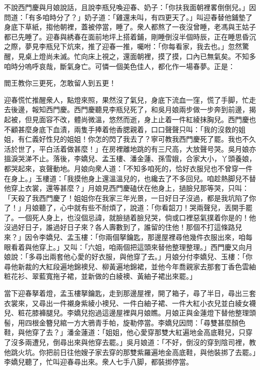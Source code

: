 不說西門慶與月娘說話，且說李瓶兒喚迎春、奶子：「你扶我面朝裡畧倒倒兒。」因問道：「有多咱時分了？」奶子道：「雞還未叫，有四更天了。」叫迎春替他鋪墊了身底下草紙，搊他朝裡，蓋被停當，睡了。衆人都熬了一夜沒曾睡，老馮與王姑子都已先睡了。迎春與綉春在面前地坪上搭着鋪，剛睡倒沒半個時辰，正在睡思昏沉之際，夢見李瓶兒下炕來，推了迎春一推，囑咐：「你每看家，我去也。」忽然驚醒，見桌上燈尚未滅。忙向床上視之，還面朝裡，摸了摸，口內已無氣矣。不知多咱時分嗚呼哀哉，斷氣身亡。可憐一個美色佳人，都化作一場春夢。正是：

\begin{myquote}
閻王教你三更死，怎敢留人到五更！
\end{myquote}

迎春慌忙推醒衆人，點燈來照，果然沒了氣兒，身底下流血一窪，慌了手脚，忙走去後邊，報知西門慶。西門慶聽見李瓶兒死了，和吳月娘兩步做一步奔到前邊，揭起被，但見面容不改，體尚微溫，悠然而逝，身上止着一件紅綾抹胸兒。西門慶也不顧甚麼身底下血漬，兩隻手捧着他香腮親着，口口聲聲只叫：「我的沒救的姐姐，有仁義好性兒的姐姐！你怎的閃了我去了？寧可教我西門慶死了罷。我也不久活於世了，平白活着做甚麼！」在房裡離地跳的有三尺高，大放聲号哭。吳月娘亦搵淚哭涕不止。落後，李嬌兒、孟玉樓、潘金蓮、孫雪娥，合家大小，丫頭養娘，都哭起來，哀聲動地。月娘向衆人道：「不知多咱死的，恰好衣服兒也不曾穿一件在身上。」玉樓道：「我摸他身上還溫溫兒的，也纔去了不多回兒。咱趁熱脚兒不替他穿上衣裳，還等甚麼？」月娘見西門慶磕伏在他身上，撾臉兒那等哭，只叫：「天殺了我西門慶了！姐姐你在我家三年光景，一日好日子沒過，{}都是我坑陷了你了！」{}月娘聽了，心中就有些不耐煩了，說道：「你看韶刀！哭兩聲兒，丟開手罷了。一個死人身上，也沒個忌諱，就臉撾着臉兒哭，倘或口裡惡氣撲着你是的！他沒過好日子，誰過好日子來？{}各人壽數到了，誰留的住他！那個不打這條路兒來？」因令李嬌兒、孟玉樓：「你兩個拏鑰匙，那邊屋裡尋他幾件衣服出來，咱每眼看着與他穿上。」又叫：「六姐，咱兩個把這頭來替他整理整理。」西門慶又向月娘說：「多尋出兩套他心愛的好衣服，與他穿了去。」月娘分付李嬌兒、玉樓：「你尋他新裁的大紅段遍地錦襖兒、柳黃遍地錦裙，並他今年喬親家去那套丁香色雲紬粧花衫、翠藍寬拖子裙，並新做的白綾襖、黃紬子裙出來罷。」

當下迎春拏着燈，孟玉樓拏鑰匙，走到那邊屋裡，開了箱子，尋了半日，尋出三套衣裳來，又尋出一件襯身紫綾小襖兒、{}一件白紬子裙、一件大紅小衣兒並白綾女襪兒、粧花膝褲腿兒。李嬌兒抱過這邊屋裡與月娘瞧。月娘正與金蓮燈下替他整理頭髻，用四根金簪兒綰一方大鴉青手帕，旋勒停當。李嬌兒因問：「尋雙甚麼顏色鞋，與他穿了去？」潘金蓮道：「姐姐，他心愛穿那雙大紅遍地金高底鞋兒，只穿了沒多兩遭兒，倒尋出來與他穿去罷。」吳月娘道：「不好，倒沒的穿到陰司裡，教他跳火坑。你把前日往他嫂子家去穿的那雙紫羅遍地金高底鞋，與他裝挷了去罷。」李嬌兒聽了，忙叫迎春尋出來。衆人七手八脚，都裝挷停當。

